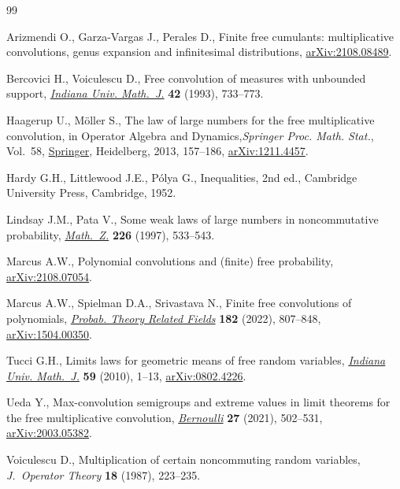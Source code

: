 \documentclass[pdftex]{sigma}
\numberwithin{equation}{section}
\begin{document}
\begin{thebibliography}{99}
\footnotesize\itemsep=0pt

Arizmendi O., Garza-Vargas J., Perales D., Finite free cumulants:
  multiplicative convolutions, genus expansion and infinitesimal distributions,
  \href{http://arxiv.org/abs/2108.08489}{arXiv:2108.08489}.

Bercovici H., Voiculescu D., Free convolution of measures with unbounded
  support, \href{https://doi.org/10.1512/iumj.1993.42.42033}{\textit{Indiana Univ. Math.~J.}} \textbf{42} (1993), 733--773.

Haagerup U., M\"oller S., The law of large numbers for the free multiplicative
  convolution, in Operator Algebra and Dynamics,\textit{Springer Proc. Math.
  Stat.}, Vol.~58, \href{https://doi.org/10.1007/978-3-642-39459-1_8}{Springer}, Heidelberg, 2013, 157--186, \href{http://arxiv.org/abs/1211.4457}{arXiv:1211.4457}.

Hardy G.H., Littlewood J.E., P\'olya G., Inequalities, 2nd ed., Cambridge University Press, Cambridge, 1952.

Lindsay J.M., Pata V., Some weak laws of large numbers in noncommutative
  probability, \href{https://doi.org/10.1007/PL00004356}{\textit{Math.~Z.}} \textbf{226} (1997), 533--543.

Marcus A.W., Polynomial convolutions and (finite) free probability,
  \href{http://arxiv.org/abs/2108.07054}{arXiv:2108.07054}.

Marcus A.W., Spielman D.A., Srivastava N., Finite free convolutions of
  polynomials, \href{https://doi.org/10.1007/s00440-021-01105-w}{\textit{Probab. Theory Related Fields}} \textbf{182} (2022),
  807--848, \href{http://arxiv.org/abs/1504.00350}{arXiv:1504.00350}.

Tucci G.H., Limits laws for geometric means of free random variables,
  \href{https://doi.org/10.1512/iumj.2010.59.3775}{\textit{Indiana Univ. Math.~J.}} \textbf{59} (2010), 1--13,
  \href{http://arxiv.org/abs/0802.4226}{arXiv:0802.4226}.

Ueda Y., Max-convolution semigroups and extreme values in limit theorems for
  the free multiplicative convolution, \href{https://doi.org/10.3150/20-BEJ1247}{\textit{Bernoulli}} \textbf{27} (2021),
  502--531, \href{http://arxiv.org/abs/2003.05382}{arXiv:2003.05382}.

Voiculescu D., Multiplication of certain noncommuting random variables,
  \textit{J.~Operator Theory} \textbf{18} (1987), 223--235.

\end{thebibliography}\LastPageEnding
\end{document}
